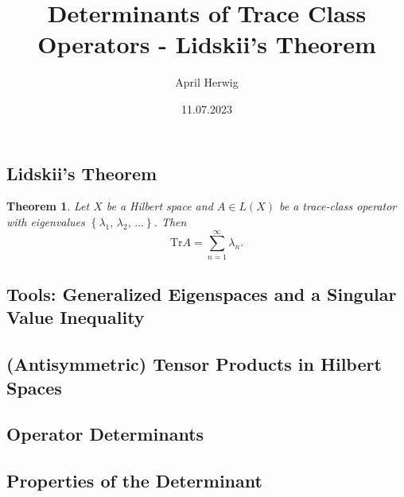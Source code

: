 \documentclass[a4paper,draft]{article}
\title{\vspace*{-5ex}Determinants of Trace Class Operators - Lidskii's Theorem}
\author{\vspace*{-15ex}April Herwig}
\date{11.07.2023}
\newtheorem{theorem}{Theorem}
\newcommand{\Tr}{\text{Tr}}
\begin{document}
\maketitle

\subsection{Lidskii's Theorem}

\begin{theorem}
    Let $X$ be a Hilbert space and $A \in L(X)$ be a trace-class operator with eigenvalues $\left\{ \lambda_1,\, \lambda_2,\, \ldots \right\}$. Then 
    \begin{equation}
        \Tr A = \sum_{n=1}^{\infty} \lambda_n . 
    \end{equation}
\end{theorem}

\subsection{Tools: Generalized Eigenspaces and a Singular Value Inequality}

\subsection{(Antisymmetric) Tensor Products in Hilbert Spaces}

\subsection{Operator Determinants}

\subsection{Properties of the Determinant}

\end{document}
